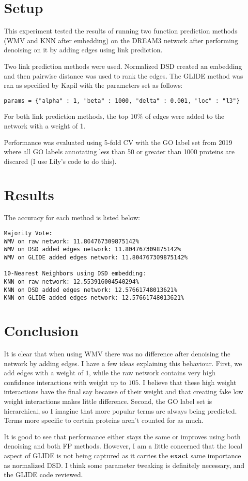 \documentclass[11pt]{article}
\author{Henri Schmidt}
\date{\today}
\title{}
\begin{document}
\tableofcontents

\section{Setup}
\label{sec:orga039739}
This experiment tested the results of running two function prediction
methods (WMV and KNN after embedding) on the DREAM3 network after
performing denoising on it by adding edges using link prediction.

Two link prediction methods were used. Normalized DSD created an
embedding and then pairwise distance was used to rank the edges. The
GLIDE method was ran as specified by Kapil with the parameters 
set as follows:

\begin{verbatim}
params = {"alpha" : 1, "beta" : 1000, "delta" : 0.001, "loc" : "l3"}
\end{verbatim}

For both link prediction methods, the top 10\% of edges were added to
the network with a weight of 1.

Performance was evaluated using 5-fold CV with the GO label set from
2019 where all GO labels annotating less than 50 or greater than 1000
proteins are discared (I use Lily's code to do this).

\section{Results}
\label{sec:orge08d1a1}
The accuracy for each method is listed below:

\begin{verbatim}
Majority Vote: 
WMV on raw network: 11.804767309875142%
WMV on DSD added edges network: 11.804767309875142%
WMV on GLIDE added edges network: 11.804767309875142%

10-Nearest Neighbors using DSD embedding:
KNN on raw network: 12.553916004540294%
KNN on DSD added edges network: 12.57661748013621%
KNN on GLIDE added edges network: 12.57661748013621%
\end{verbatim}

\section{Conclusion}
\label{sec:orgd93427d}
It is clear that when using WMV there was no difference after
denoising the network by adding edges. I have a few ideas explaining
this behaviour. First, we add edges with a weight of \(1\), while the
raw network contains very high confidence interactions with weight up
to \(105\). I believe that these high weight interactions have the final
say because of their weight and that creating fake low weight
interactions makes little difference. Second, the GO label set is
hierarchical, so I imagine that more popular terms are always being
predicted. Terms more specific to certain proteins aren't counted for
as much.

It is good to see that performance either stays the same or improves
using both denoising and both FP methods. However, I am a little
concerned that the local aspect of GLIDE is not being captured as it
carries the \textbf{exact} same importance as normalized DSD. I think some
parameter tweaking is definitely necessary, and the GLIDE code
reviewed.
\end{document}
